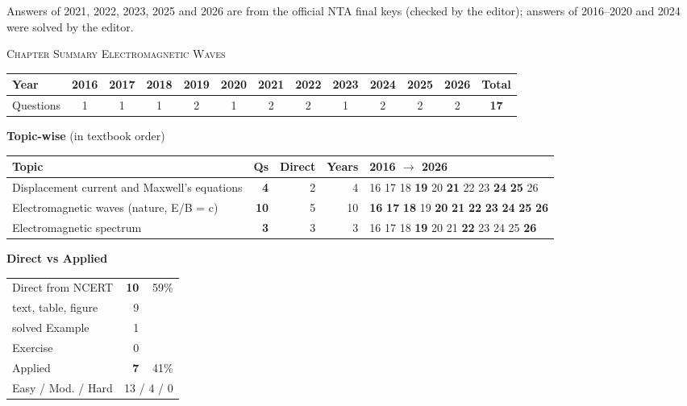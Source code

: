 {\footnotesize Answers of 2021, 2022, 2023, 2025 and 2026 are from the official NTA final keys (checked by the editor); answers of 2016--2020 and 2024 were solved by the editor.
}\par
\par{}\vspace{14pt}
\begin{center}{}\par
{\large\color{navy}\scshape Chapter Summary \textperiodcentered{} Electromagnetic Waves}\end{center}
{\small\setlength{\tabcolsep}{3.5pt}
\begin{tabular*}{\linewidth}{@{\extracolsep{\fill}}l*{11}{c}c@{}}\toprule
Year & 2016 & 2017 & 2018 & 2019 & 2020 & 2021 & 2022 & 2023 & 2024 & 2025 & 2026 & Total\\\midrule
Questions & 1 & 1 & 1 & 2 & 1 & 2 & 2 & 1 & 2 & 2 & 2 & \textbf{17}\\\bottomrule\end{tabular*}}\par\medskip
{\small\textbf{\color{crimson}Topic-wise} (in textbook order)\par\smallskip
\begin{tabularx}{\linewidth}{@{}>{\raggedright\arraybackslash}Xrrrl@{}}\toprule
Topic & Qs & Direct & Years & 2016 $\rightarrow$ 2026\\\midrule
Displacement current and Maxwell's equations & \textbf{4} & 2 & 4 & {\scriptsize {\color{gray!45}16} {\color{gray!45}17} {\color{gray!45}18} \textbf{19} {\color{gray!45}20} \textbf{21} {\color{gray!45}22} {\color{gray!45}23} \textbf{24} \textbf{25} {\color{gray!45}26}}\\
Electromagnetic waves (nature, E/B = c) & \textbf{10} & 5 & 10 & {\scriptsize \textbf{16} \textbf{17} \textbf{18} {\color{gray!45}19} \textbf{20} \textbf{21} \textbf{22} \textbf{23} \textbf{24} \textbf{25} \textbf{26}}\\
Electromagnetic spectrum & \textbf{3} & 3 & 3 & {\scriptsize {\color{gray!45}16} {\color{gray!45}17} {\color{gray!45}18} \textbf{19} {\color{gray!45}20} {\color{gray!45}21} \textbf{22} {\color{gray!45}23} {\color{gray!45}24} {\color{gray!45}25} \textbf{26}}\\
\bottomrule\end{tabularx}}\par\medskip
\begin{minipage}[t]{0.34\linewidth}{\small\textbf{\color{crimson}Direct vs Applied}\par\smallskip
\begin{tabular}{@{}lrr@{}}\toprule
Direct from NCERT & \textbf{10} & 59\%\\
\quad text, table, figure & 9 &\\
\quad solved Example & 1 &\\
\quad Exercise & 0 &\\
Applied & \textbf{7} & 41\%\\\midrule
Easy / Mod. / Hard & \multicolumn{2}{r}{13 / 4 / 0}\\\bottomrule
\end{tabular}}\end{minipage}\hfill
